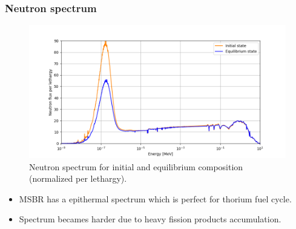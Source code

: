 \begin{frame}
  \frametitle{Neutron spectrum}
   \vspace{-0.5in}
  \begin{figure}[t]
   \hspace*{-0.39in}
   \includegraphics[height=0.8\textheight]{./images/spectrum.png}
   \vspace{-0.1in}
   \caption{Neutron spectrum for initial and equilibrium composition (normalized per lethargy).}
    \end{figure}
    \vspace{-0.1in}
    \begin{itemize}
       \item \gls{MSBR} has a epithermal spectrum which is perfect for thorium fuel cycle.
       \item Spectrum becames harder due to heavy fission products accumulation.
    \end{itemize}   
\end{frame}

